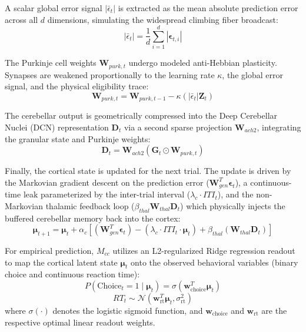 \documentclass[12pt, a4paper]{extarticle}
\begin{document}
A scalar global error signal $\left| \bar{\epsilon}_{t} \right|$ is extracted as the mean absolute prediction error across all $d$ dimensions, simulating the widespread climbing fiber broadcast:
\begin{equation}
	\left| \bar{\epsilon}_{t} \right| = \frac{1}{d} \sum_{i=1}^{d} \left| \boldsymbol{\epsilon}_{t, i} \right|\label{c_pe}
\end{equation}

The Purkinje cell weights $\mathbf{W}_{purk, t}$ undergo modeled anti-Hebbian plasticity. Synapses are weakened proportionally to the learning rate $\kappa$, the global error signal, and the physical eligibility trace:
\begin{equation}
	\mathbf{W}_{purk, t} = \mathbf{W}_{purk, t-1} - \kappa ( \left| \bar{\epsilon}_{t} \right| \mathbf{Z}_{t})\label{purk}
\end{equation}

The cerebellar output is geometrically compressed into the Deep Cerebellar Nuclei (DCN) representation $\mathbf{D}_{t}$ via a second sparse projection $\mathbf{W}_{ach2}$, integrating the granular state and Purkinje weights:
\begin{equation}
	\mathbf{D}_{t} = \mathbf{W}_{ach2} (\mathbf{G}_{t} \odot \mathbf{W}_{purk, t})\label{forward_pass}
\end{equation}

Finally, the cortical state is updated for the next trial. The update is driven by the Markovian gradient descent on the prediction error ($\mathbf{W}^{T}_{gen} \boldsymbol{\epsilon}_{t}$), a continuous-time leak parameterized by the inter-trial interval ($\lambda_{c} \cdot ITI_{t}$), and the non-Markovian thalamic feedback loop ($\beta_{thal} \mathbf{W}_{thal} \mathbf{D}_{t}$) which physically injects the buffered cerebellar memory back into the cortex:
\begin{equation}
	\boldsymbol{\mu}_{t+1} = \boldsymbol{\mu}_{t} + \alpha_{c} \left[(\mathbf{W}^{T}_{gen} \boldsymbol{\epsilon}_{t}) - (\lambda_{c} \cdot ITI_{t} \cdot \boldsymbol{\mu}_{t}) + \beta_{thal} (\mathbf{W}_{thal} \mathbf{D}_{t})\right]\label{thalam_ctx_pass}
\end{equation}

For empirical prediction, $M_{cc}$ utilizes an L2-regularized Ridge regression readout to map the cortical latent state $\boldsymbol{\mu}_t$ onto the observed behavioral variables (binary choice and continuous reaction time):
\begin{equation}
	P(\text{Choice}_t = 1 \mid \boldsymbol{\mu}_t) = \sigma(\mathbf{w}_{\text{choice}}^T \boldsymbol{\mu}_t)
\end{equation}
\begin{equation}
	RT_t \sim \mathcal{N}(\mathbf{w}_{\text{rt}}^T \boldsymbol{\mu}_t, \sigma_{\text{rt}}^2)
\end{equation}
where $\sigma(\cdot)$ denotes the logistic sigmoid function, and $\mathbf{w}_{\text{choice}}$ and $\mathbf{w}_{\text{rt}}$ are the respective optimal linear readout weights.
\end{document}
